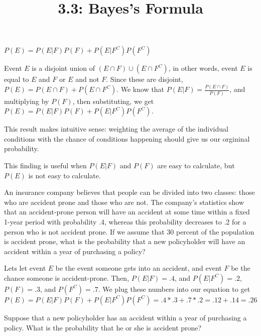 \documentclass{article}
\title{3.3: Bayes's Formula}
\begin{document}
\maketitle

\begin{proposition}
$P(E) = P(E\vert F)P(F) + P(E\vert F^C)P(F^C)$
\end{proposition}

\begin{customproof}
Event $E$ is a disjoint union of $(E\cap F) \cup (E\cap F^C)$, in other words, event $E$ is equal to $E$ and $F$ or $E$ and not $F$. Since these are disjoint, $P(E) = P(E \cap F) + P(E \cap F^C)$. We know that $P(E \vert F) = \frac{P(E \cap F)}{P(F)}$, and multiplying by $P(F)$, then substituting, we get $P(E) = P(E \vert F)P(F) + P(E \vert F^C)P(F^C)$.
\end{customproof}

This result makes intuitive sense: weighting the average of the individual conditions with the chance of conditions happening should give us our orgininal probability. 

This finding is useful when $P(E \vert F)$ and $P(F)$ are easy to calculate, but $P(E)$ is not easy to calculate.

\begin{example}[3a]
An insurance company believes that people can be divided into two classes: those who are accident prone and those who are not. The company's statistics show that an accident-prone person will have an accident at some time within a fixed 1-year period with probability .4, whereas this probability decreases to .2 for a person who is not accident prone. If we assume that 30 percent of the population is accident prone, what is the probability that a new policyholder will have an accident within a year of purchasing a policy?
\end{example}

\begin{solution}
Lets let event $E$ be the event someone gets into an accident, and event $F$ be the chance someone is accident-prone. Then, $P(E \vert F) = .4$, and $P(E \vert F^C) = .2$, $P(F) = .3$, and $P(F^C) = .7$. We plug these numbers into our equation to get $P(E) = P(E\vert F) P(F) + P(E\vert F^C)P(F^C) = .4*.3 + .7*.2 = .12 + .14 = .26$
\end{solution}

\begin{example}[3a Part 2]
Suppose that a new policyholder has an accident within a year of purchasing a policy. What is the probability that he or she is accident prone?
\end{example}
\end{document}
